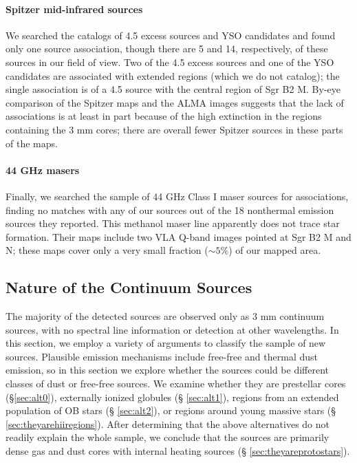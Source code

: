 \documentclass[twocolumn]{aastex61}
\begin{document}
\paragraph{Spitzer mid-infrared sources}
We searched the \citet{Yusef-Zadeh2009a} catalogs of 4.5 \um excess sources and
YSO candidates and found only one source association, though there are 5 and
14, respectively, of these sources in our field of view.  Two of the 4.5 \um
excess sources and one of the YSO candidates are associated with extended \hii
regions (which we do not catalog); the single association is of a 4.5 \um source with the central region
of Sgr B2 M. By-eye comparison of the Spitzer maps and the ALMA images suggests
that the lack of associations is at least in part because of the high
extinction in the regions containing the 3 mm cores; there are overall fewer
Spitzer sources in these parts of the maps.

\paragraph{44 GHz \methanol masers}
Finally, we searched the \citet{Mehringer1997a} sample of 44 GHz Class I
\methanol maser sources for associations, finding no matches with any of our
sources out of the 18 nonthermal \methanol emission sources they reported.
This methanol maser line apparently does not trace star formation.
Their maps include two VLA Q-band images pointed at Sgr B2 M and N; these
maps cover only a very small fraction ($\sim5\%$) of our mapped area.


\subsection{Nature of the Continuum Sources}
\label{sec:classification}
The majority of the detected sources are observed only as 3 mm continuum
sources, with no spectral line information or detection at other wavelengths.
In this section, we employ a variety of arguments to classify the sample of new
sources.    Plausible emission mechanisms include free-free and thermal dust
emission, so in this section we explore whether the sources could be different
classes of dust or free-free sources.  We examine whether they are
prestellar cores (\S \ref{sec:alt0}), externally ionized globules (\S
\ref{sec:alt1}), \hii regions from an extended population of OB stars (\S
\ref{sec:alt2}), or \hii regions around young massive stars (\S
\ref{sec:theyarehiiregions}).  After determining that the above alternatives do
not readily explain the whole sample, we conclude that the sources are
primarily dense gas and dust cores with internal heating sources (\S
\ref{sec:theyareprotostars}).
\end{document}
